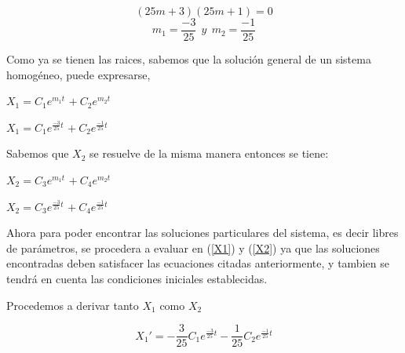 \documentclass[titlepage]{article}
\begin{document}
                    \begin{equation*}
                        (25m + 3)(25m+1) = 0
                    \end{equation*}\vspace{0.2cm}
                    \begin{equation*}
                        m_1= \frac{-3}{25} ~~y~~ m_2=\frac{-1}{25}
                    \end{equation*}\vspace{0.2cm}
                    
                Como ya se tienen las raices, sabemos que la solución general de un sistema homogéneo, puede expresarse,
                    
                    \begin{center}
                        $X_1 = C_1e^{m_1t}$ $+~C_2e^{m_2t}$\par\vspace{0.2cm}
                        $X_1 = C_1e^{\frac{-3}{25}t}$ $+~C_2e^{\frac{-1}{25}t}$
    
                    \end{center}
                Sabemos que $X_2$ se resuelve de la misma manera entonces se tiene:
                    
                    \begin{center}
                        $X_2 = C_3e^{m_1t}$ $+~C_4e^{m_2t}$\par\vspace{0.2cm}
                        $X_2 = C_3e^{\frac{-3}{25}t}$ $+~C_4e^{\frac{-1}{25}t}$
    
                    \end{center}
                
                Ahora para poder encontrar las soluciones particulares del sistema, es decir libres de parámetros, se procedera a evaluar en (\ref{X1}) y (\ref{X2}) ya que las soluciones encontradas deben satisfacer las ecuaciones citadas anteriormente, y tambien se tendrá en cuenta las condiciones iniciales establecidas.\par
                
                Procedemos a derivar tanto $X_1$ como $X_2$ 
                    
                    \begin{equation*}
                        X_1' = -\frac{3}{25}C_1e^{\frac{-3}{25}t} -  \frac{1}{25}C_2e^{\frac{-1}{25}t}   
                    \end{equation*}
                    
\end{document}
